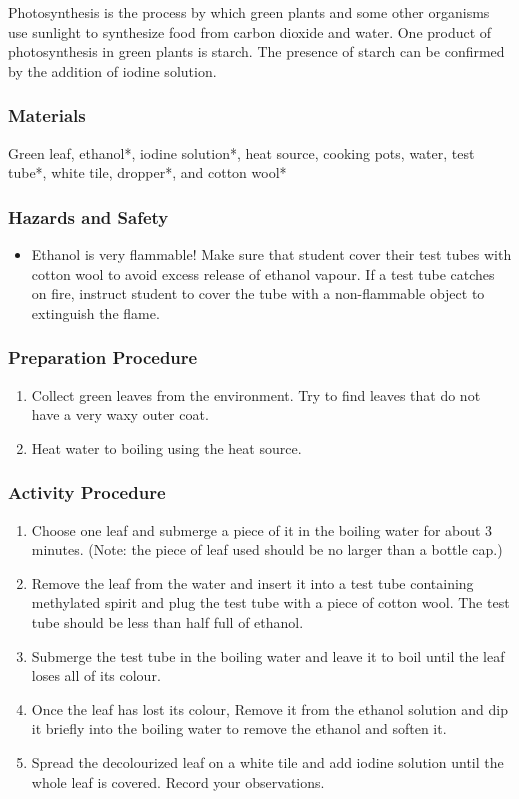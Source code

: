 Photosynthesis is the process by which green plants and some other organisms use sunlight to synthesize food from carbon dioxide and water. One product of photosynthesis in green plants is starch. The presence of starch can be confirmed by the addition of iodine solution.

\subsubsection*{Materials}
Green leaf, ethanol*, iodine solution*, heat source, cooking pots, water, test tube*, white tile, dropper*, and cotton wool*

\subsubsection*{Hazards and Safety}
\begin{itemize}
\item{Ethanol is very flammable! Make sure that student cover their test tubes with cotton wool to avoid excess release of ethanol vapour. If a test tube catches on fire, instruct student to cover the tube with a non-flammable object to extinguish the flame.}
\end{itemize}


\subsubsection*{Preparation Procedure}
\begin{enumerate}
\item{Collect green leaves from the environment. Try to find leaves that do not have a very waxy outer coat.}
\item{Heat water to boiling using the heat source.}
\end{enumerate}

\subsubsection*{Activity Procedure}
\begin{enumerate}
\item{Choose one leaf and submerge a piece of it in the boiling water for about 3 minutes. (Note: the piece of leaf used should be no larger than a bottle cap.)}
\item{Remove the leaf from the water and insert it into a test tube containing methylated spirit and plug the test tube with a piece of cotton wool. The test tube should be less than half full of ethanol.}
\item{Submerge the test tube in the boiling water and leave it to boil until the leaf loses all of its colour.}
\item{Once the leaf has lost its colour, Remove it from the ethanol solution and dip it briefly into the boiling water to remove the ethanol and soften it.}
\item{Spread the decolourized leaf on a white tile and add iodine solution until the whole leaf is covered. Record your observations.}
\end{enumerate}

